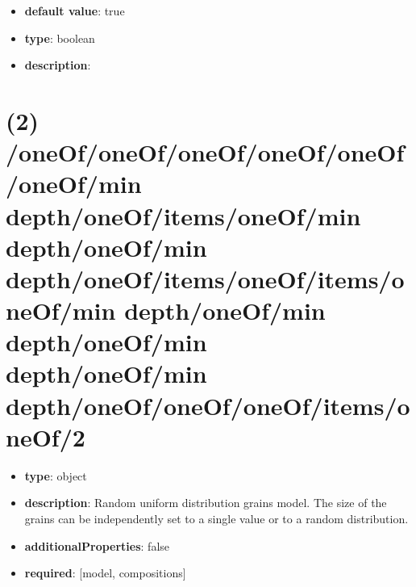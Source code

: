 \begin{itemize}[leftmargin=4em]\item {\bf default value}: true
\item {\bf type}: boolean
\item {\bf description}: 
\end{itemize}\section{(2) /oneOf/oneOf/oneOf/oneOf/oneOf/oneOf/min depth/oneOf/items/oneOf/min depth/oneOf/min depth/oneOf/items/oneOf/items/oneOf/min depth/oneOf/min depth/oneOf/min depth/oneOf/min depth/oneOf/oneOf/oneOf/items/oneOf/2}
\begin{itemize}[leftmargin=2em]\item {\bf type}: object
\item {\bf description}: Random uniform distribution grains model. The size of the grains can be independently set to a single value or to a random distribution.
\item {\bf additionalProperties}: false
\item {\bf required}: [model, compositions]\end{itemize}
